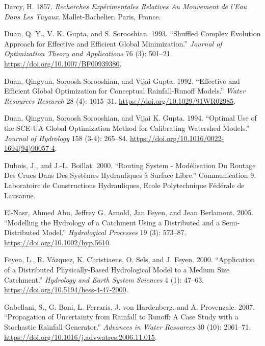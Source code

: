 \documentclass[
  letterpaper,
  DIV=11,
  numbers=noendperiod]{scrreprt}
\newlength{\cslhangindent}
\newlength{\cslentryspacingunit} %
\newenvironment{CSLReferences}[2] %
 {%
  \setlength{\parindent}{0pt}
  \ifodd #1
  \let\oldpar\par
  \def\par{\hangindent=\cslhangindent\oldpar}
  \fi
  \setlength{\parskip}{#2\cslentryspacingunit}
 }%
 {}
\begin{document}
\begin{CSLReferences}{1}{0}
\leavevmode{}%
Darcy, H. 1857. \emph{Recherches {Expérimentales} {Relatives} Au
{Mouvement} de l'{Eau} Dans Les {Tuyaux}}. Mallet-Bachelier. Paris,
France.

\leavevmode{}%
Duan, Q. Y., V. K. Gupta, and S. Sorooshian. 1993. {``Shuffled Complex
Evolution Approach for Effective and Efficient Global Minimization.''}
\emph{Journal of Optimization Theory and Applications} 76 (3): 501--21.
\url{https://doi.org/10.1007/BF00939380}.

\leavevmode{}%
Duan, Qingyun, Soroosh Sorooshian, and Vijai Gupta. 1992. {``Effective
and Efficient Global Optimization for Conceptual Rainfall-Runoff
Models.''} \emph{Water Resources Research} 28 (4): 1015--31.
\url{https://doi.org/10.1029/91WR02985}.

\leavevmode{}%
Duan, Qingyun, Soroosh Sorooshian, and Vijai K. Gupta. 1994. {``Optimal
Use of the {SCE}-{UA} Global Optimization Method for Calibrating
Watershed Models.''} \emph{Journal of Hydrology} 158 (3-4): 265--84.
\url{https://doi.org/10.1016/0022-1694(94)90057-4}.

\leavevmode{}%
Dubois, J., and J.-L. Boillat. 2000. {``Routing {System} -
{Modélisation} Du Routage Des Crues Dans Des Systèmes Hydrauliques à
Surface Libre.''} Communication 9. Laboratoire de Constructions
Hydrauliques, Ecole Polytechnique Fédérale de Lausanne.

\leavevmode{}%
El-Nasr, Ahmed Abu, Jeffrey G. Arnold, Jan Feyen, and Jean Berlamont.
2005. {``Modelling the Hydrology of a Catchment Using a Distributed and
a Semi-Distributed Model.''} \emph{Hydrological Processes} 19 (3):
573--87. \url{https://doi.org/10.1002/hyp.5610}.

\leavevmode{}%
Feyen, L., R. Vázquez, K. Christiaens, O. Sels, and J. Feyen. 2000.
{``Application of a Distributed Physically-Based Hydrological Model to a
Medium Size Catchment.''} \emph{Hydrology and Earth System Sciences} 4
(1): 47--63. \url{https://doi.org/10.5194/hess-4-47-2000}.

\leavevmode{}%
Gabellani, S., G. Boni, L. Ferraris, J. von Hardenberg, and A.
Provenzale. 2007. {``Propagation of Uncertainty from Rainfall to Runoff:
{A} Case Study with a Stochastic Rainfall Generator.''} \emph{Advances
in Water Resources} 30 (10): 2061--71.
\url{https://doi.org/10.1016/j.advwatres.2006.11.015}.


\end{CSLReferences}
\end{document}
